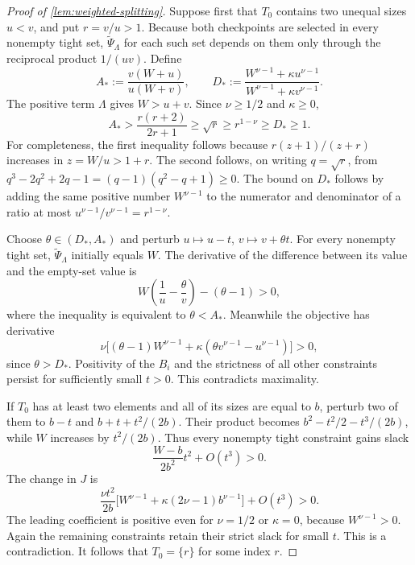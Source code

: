 \documentclass[11pt,letterpaper]{article}
\theoremstyle{definition}
\begin{document}
\begin{proof}[Proof of \cref{lem:weighted-splitting}]
Suppose first that $T_0$ contains two unequal sizes $u<v$, and put $r=v/u>1$.
Because both checkpoints are selected in every nonempty tight set, $\widetilde\Psi_\Lambda$ for each such set depends on them only through the reciprocal product $1/(uv)$.
Define
\[
  A_*:=\frac{v(W+u)}{u(W+v)},\qquad
  D_*:=\frac{W^{\nu-1}+\kappa u^{\nu-1}}
             {W^{\nu-1}+\kappa v^{\nu-1}}.
\]
The positive term $\Lambda$ gives $W>u+v$.
Since $\nu\ge1/2$ and $\kappa\ge0$,
\begin{equation*}
  A_*>\frac{r(r+2)}{2r+1}\ge\sqrt r
  \ge r^{1-\nu}\ge D_*\ge1.
\end{equation*}
For completeness, the first inequality follows because $r(z+1)/(z+r)$ increases in $z=W/u>1+r$.
The second follows, on writing $q=\sqrt r$, from $q^3-2q^2+2q-1=(q-1)(q^2-q+1)\ge0$.
The bound on $D_*$ follows by adding the same positive number $W^{\nu-1}$ to the numerator and denominator of a ratio at most $u^{\nu-1}/v^{\nu-1}=r^{1-\nu}$.

Choose $\theta\in(D_*,A_*)$ and perturb $u\mapsto u-t$, $v\mapsto v+\theta t$.
For every nonempty tight set, $\widetilde\Psi_\Lambda$ initially equals $W$.
The derivative of the difference between its value and the empty-set value is
\[
  W\left(\frac1u-\frac\theta v\right)-(\theta-1)>0,
\]
where the inequality is equivalent to $\theta<A_*$.
Meanwhile the objective has derivative
\[
  \nu\bigl[(\theta-1)W^{\nu-1}
     +\kappa(\theta v^{\nu-1}-u^{\nu-1})\bigr]>0,
\]
since $\theta>D_*$.
Positivity of the $B_i$ and the strictness of all other constraints persist for sufficiently small $t>0$.
This contradicts maximality.

If $T_0$ has at least two elements and all of its sizes are equal to $b$, perturb two of them to $b-t$ and $b+t+t^2/(2b)$.
Their product becomes $b^2-t^2/2-t^3/(2b)$, while $W$ increases by $t^2/(2b)$.
Thus every nonempty tight constraint gains slack
\[
  \frac{W-b}{2b^2}t^2+O(t^3)>0.
\]
The change in $J$ is
\[
  \frac{\nu t^2}{2b}
  \bigl[W^{\nu-1}+\kappa(2\nu-1)b^{\nu-1}\bigr]+O(t^3)>0.
\]
The leading coefficient is positive even for $\nu=1/2$ or $\kappa=0$, because $W^{\nu-1}>0$.
Again the remaining constraints retain their strict slack for small $t$.
This is a contradiction.
It follows that $T_0=\{r\}$ for some index $r$.


\end{proof}
\end{document}
